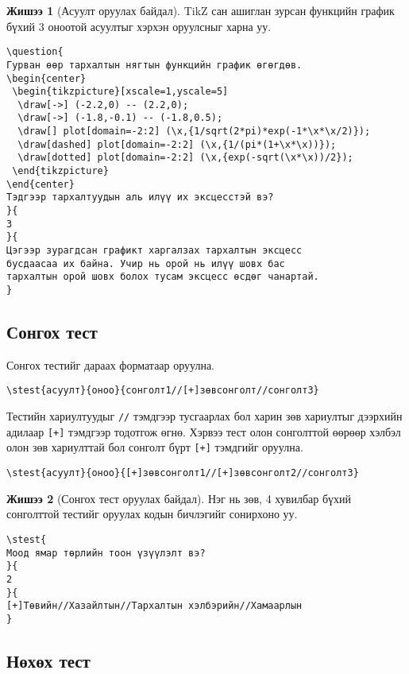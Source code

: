 \documentclass[10pt]{article}
\theoremstyle{definition}
\newtheorem{example}{Жишээ}
\begin{document}
\begin{example}[Асуулт оруулах байдал]
TikZ сан ашиглан зурсан функцийн график бүхий 3 оноотой асуултыг хэрхэн оруулсныг харна уу.
\begin{verbatim}
\question{
Гурван өөр тархалтын нягтын функцийн график өгөгдөв.
\begin{center}
 \begin{tikzpicture}[xscale=1,yscale=5]
  \draw[->] (-2.2,0) -- (2.2,0);
  \draw[->] (-1.8,-0.1) -- (-1.8,0.5);
  \draw[] plot[domain=-2:2] (\x,{1/sqrt(2*pi)*exp(-1*\x*\x/2)});
  \draw[dashed] plot[domain=-2:2] (\x,{1/(pi*(1+\x*\x))});
  \draw[dotted] plot[domain=-2:2] (\x,{exp(-sqrt(\x*\x))/2});
 \end{tikzpicture}
\end{center}
Тэдгээр тархалтуудын аль илүү их эксцесстэй вэ?
}{
3
}{
Цэгээр зурагдсан графикт харгалзах тархалтын эксцесс 
бусдаасаа их байна. Учир нь орой нь илүү шовх бас 
тархалтын орой шовх болох тусам эксцесс өсдөг чанартай.
}
\end{verbatim}
\end{example}

\subsection{Сонгох тест}

Сонгох тестийг дараах форматаар оруулна.
\begin{verbatim}
\stest{асуулт}{оноо}{сонголт1//[+]зөвсонголт//сонголт3}
\end{verbatim}
Тестийн хариултуудыг \texttt{//} тэмдгээр тусгаарлах бол харин зөв хариултыг дээрхийн адилаар \texttt{[+]} тэмдгээр тодотгож өгнө. Хэрвээ тест олон сонголттой өөрөөр хэлбэл олон зөв хариулттай бол сонголт бүрт \texttt{[+]} тэмдгийг оруулна.
\begin{verbatim}
\stest{асуулт}{оноо}{[+]зөвсонголт1//[+]зөвсонголт2//сонголт3}
\end{verbatim}

\begin{example}[Сонгох тест оруулах байдал]
Нэг нь зөв, 4 хувилбар бүхий сонголттой тестийг оруулах кодын бичлэгийг сонирхоно уу.
\begin{verbatim}
\stest{
Моод ямар төрлийн тоон үзүүлэлт вэ?
}{
2
}{
[+]Төвийн//Хазайлтын//Тархалтын хэлбэрийн//Хамаарлын
}
\end{verbatim}
\end{example}

\subsection{Нөхөх тест}
\end{document}
